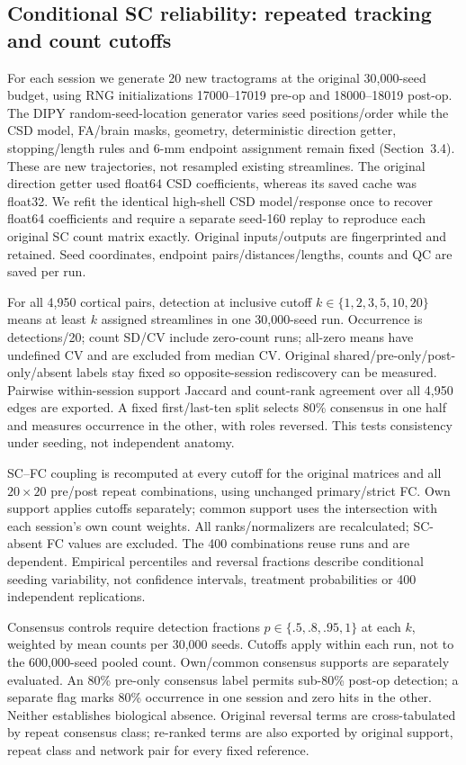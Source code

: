 \documentclass[11pt,a4paper]{article}
\begin{document}
\subsection{Conditional SC reliability: repeated tracking and count cutoffs}\label{sec:screliabilitymethods}
For each session we generate 20 new tractograms at the original 30,000-seed budget, using RNG initializations 17000--17019 pre-op and 18000--18019 post-op. The DIPY random-seed-location generator \citep{dipytracking} varies seed positions/order while the CSD model, FA/brain masks, geometry, deterministic direction getter, stopping/length rules and 6-mm endpoint assignment remain fixed (Section~3.4). These are new trajectories, not resampled existing streamlines. The original direction getter used float64 CSD coefficients, whereas its saved cache was float32. We refit the identical high-shell CSD model/response once to recover float64 coefficients and require a separate seed-160 replay to reproduce each original SC count matrix exactly. Original inputs/outputs are fingerprinted and retained. Seed coordinates, endpoint pairs/distances/lengths, counts and QC are saved per run.

For all 4,950 cortical pairs, detection at inclusive cutoff $k\in\{1,2,3,5,10,20\}$ means at least $k$ assigned streamlines in one 30,000-seed run. Occurrence is detections/20; count SD/CV include zero-count runs; all-zero means have undefined CV and are excluded from median CV. Original shared/pre-only/post-only/absent labels stay fixed so opposite-session rediscovery can be measured. Pairwise within-session support Jaccard and count-rank agreement over all 4,950 edges are exported. A fixed first/last-ten split selects 80\% consensus in one half and measures occurrence in the other, with roles reversed. This tests consistency under seeding, not independent anatomy.

SC--FC coupling is recomputed at every cutoff for the original matrices and all $20\times20$ pre/post repeat combinations, using unchanged primary/strict FC. Own support applies cutoffs separately; common support uses the intersection with each session's own count weights. All ranks/normalizers are recalculated; SC-absent FC values are excluded. The 400 combinations reuse runs and are dependent. Empirical percentiles and reversal fractions describe conditional seeding variability, not confidence intervals, treatment probabilities or 400 independent replications.

Consensus controls require detection fractions $p\in\{.5,.8,.95,1\}$ at each $k$, weighted by mean counts per 30,000 seeds. Cutoffs apply within each run, not to the 600,000-seed pooled count. Own/common consensus supports are separately evaluated. An 80\% pre-only consensus label permits sub-80\% post-op detection; a separate flag marks 80\% occurrence in one session and zero hits in the other. Neither establishes biological absence. Original reversal terms are cross-tabulated by repeat consensus class; re-ranked terms are also exported by original support, repeat class and network pair for every fixed reference.
\end{document}
